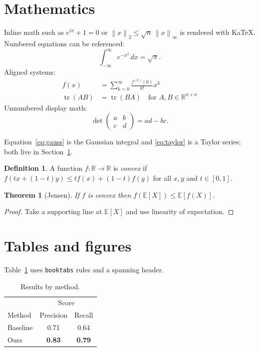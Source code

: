 \documentclass[11pt]{article}
\newcommand{\R}{\mathbb{R}}
\newcommand{\norm}[1]{\left\lVert #1 \right\rVert}
\DeclareMathOperator{\tr}{tr}
\newtheorem{theorem}{Theorem}[section]
\theoremstyle{definition}
\newtheorem{definition}{Definition}
\begin{document}
\section{Mathematics}\label{sec:math}
Inline math such as $e^{i\pi} + 1 = 0$ or \(\norm{x}_2 \le \sqrt{n}\,\norm{x}_\infty\)
is rendered with KaTeX. Numbered equations can be referenced:
\begin{equation}\label{eq:gauss}
  \int_{-\infty}^{\infty} e^{-x^2}\,dx = \sqrt{\pi}.
\end{equation}
Aligned systems:
\begin{align}
  f(x) &= \sum_{k=0}^{\infty} \frac{f^{(k)}(0)}{k!} x^k \label{eq:taylor} \\
  \tr(AB) &= \tr(BA) \quad \text{for } A, B \in \R^{n \times n}
\end{align}
Unnumbered display math:
\[ \det\begin{pmatrix} a & b \\ c & d \end{pmatrix} = ad - bc. \]

Equation~\eqref{eq:gauss} is the Gaussian integral and \eqref{eq:taylor} is a
Taylor series; both live in Section~\ref{sec:math}.

\begin{definition}
A function $f\colon \R \to \R$ is \emph{convex} if
$f(tx + (1-t)y) \le t f(x) + (1-t) f(y)$ for all $x, y$ and $t \in [0,1]$.
\end{definition}

\begin{theorem}[Jensen]\label{thm:jensen}
If $f$ is convex then $f(\mathbb{E}[X]) \le \mathbb{E}[f(X)]$.
\end{theorem}

\begin{proof}
Take a supporting line at $\mathbb{E}[X]$ and use linearity of expectation.
\end{proof}

\section{Tables and figures}
Table~\ref{tab:results} uses \texttt{booktabs} rules and a spanning header.

\begin{table}[h]
  \centering
  \caption{Results by method.}\label{tab:results}
  \begin{tabular}{l|cc}
    \toprule
    & \multicolumn{2}{c}{Score} \\
    Method & Precision & Recall \\
    \midrule
    Baseline & 0.71 & 0.64 \\
    Ours     & \textbf{0.83} & \textbf{0.79} \\
    \bottomrule
  \end{tabular}
\end{table}
\end{document}
